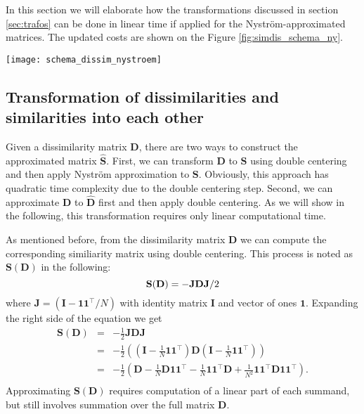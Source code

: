 \documentclass[twoside,11pt]{article}
\begin{document}
In this section we will elaborate
how the transformations discussed in section \ref{sec:trafos}
can be done in linear time if applied for the Nystr\"om-approximated matrices.
The updated costs are shown on the Figure \ref{fig:simdis_schema_ny}.

\begin{figure*}
\centering
	\texttt{[image: schema\_dissim\_nystroem]}
	\caption{Updated schema from Figure \ref{fig:simdis_schema}
	using the discussed approximation.
	The costs are now substantially smaller, provided $m \ll N$.
	}
	 \label{fig:simdis_schema_ny}
\end{figure*}

\subsection{Transformation of dissimilarities and similarities into each other}
Given a dissimilarity matrix $\mathbf{D}$,
there are two ways to construct the approximated matrix $\mathbf{\hat{S}}$.
First, we can transform $\mathbf{D}$ to $\mathbf{S}$ using double centering
and then apply Nystr\"om approximation to $\mathbf{S}$.
Obviously, this approach has quadratic time complexity
due to the double centering step.
Second, we can approximate $\mathbf{D}$ to $\mathbf{\hat{D}}$ first
and then apply double centering.
As we will show in the following,
this transformation requires only linear computational time.

As mentioned before, from the dissimilarity matrix $\mathbf{D}$
we can compute the corresponding similiarity matrix using double centering.
This process is noted as  $\mathbf{S(D)}$ in the following:
\begin{equation*}\label{eq:double_centering}
	\mathbf{S(D)} = -\mathbf{J} \mathbf{D} \mathbf{J}/2 \\
\end{equation*}
where $\mathbf{J}=(\mathbf{I}-\mathbf{1}\mathbf{1}^\top/N)$
with identity matrix $\mathbf{I}$  and vector of ones $\mathbf{1}$.
Expanding the right side of the equation we get
\begin{eqnarray*}
\mathbf{S(D)} &=& -\frac{1}{2} \mathbf{J} \mathbf{D} \mathbf{J} \nonumber \\
  &=& -\frac{1}{2} \left ( \left (\mathbf{I} - \frac{1}{N} \mathbf{1} \mathbf{1}^\top \right )
        \mathbf{D}
        \left (\mathbf{I} - \frac{1}{N} \mathbf{1} \mathbf{1}^\top \right ) \right )
        \nonumber \\
&=& -\frac{1}{2} \left (\mathbf{D} 
      -\frac{1}{N} \mathbf{D} \mathbf{1} \mathbf{1}^\top
      -\frac{1}{N} \mathbf{1} \mathbf{1}^\top \mathbf{D}
      +\frac{1}{N^2} \mathbf{1} \mathbf{1}^\top
       \mathbf{D}
       \mathbf{1} \mathbf{1}^\top \right ). \nonumber \\
\end{eqnarray*}
Approximating $\mathbf{S(D)}$ requires computation of a linear part of each summand,
but still involves summation over the full matrix $\mathbf{D}$.
\end{document}
